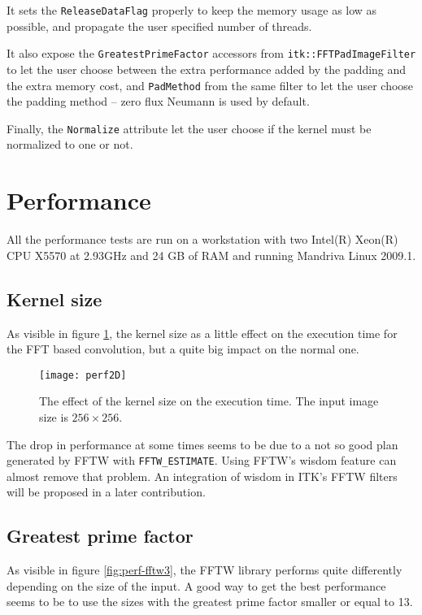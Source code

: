 \documentclass{InsightArticle}
\begin{document}
It sets the \verb$ReleaseDataFlag$ properly to keep the memory usage as low as possible, and propagate the
user specified number of threads.

It also expose the \verb$GreatestPrimeFactor$ accessors from \verb$itk::FFTPadImageFilter$ to let
the user choose between the extra performance added by the padding and the extra memory cost, and
\verb$PadMethod$ from the same filter to let the user choose the padding method -- zero flux Neumann
is used by default.

Finally, the \verb$Normalize$ attribute let the user choose if the kernel must be normalized to one
or not.

\section{Performance}

All the performance tests are run on a workstation with two Intel(R) Xeon(R) CPU X5570 at 2.93GHz
and 24 GB of RAM and running Mandriva Linux 2009.1.

\subsection{Kernel size}

As visible in figure \ref{fig:perf-kernel}, the kernel size as a little effect on the execution time
for the FFT based convolution, but a quite big impact on the normal one.

\begin{figure}[htbp]
\centering
\texttt{[image: perf2D]}
\caption{The effect of the kernel size on the execution time. The input image size is $256 \times 256$.
\label{fig:perf-kernel}}
\end{figure}

The drop in performance at some times seems to be due to a not so good plan generated by FFTW with \verb$FFTW_ESTIMATE$.
Using FFTW's wisdom feature can almost remove that problem. An integration of wisdom in ITK's FFTW
filters will be proposed in a later contribution.

\subsection{Greatest prime factor}
\label{perf:gpf}
As visible in figure \ref{fig:perf-fftw3}, the FFTW library performs quite differently depending on the
size of the input. A good way to get the best performance seems to be to use the sizes with the greatest
prime factor smaller or equal to 13.
\end{document}

